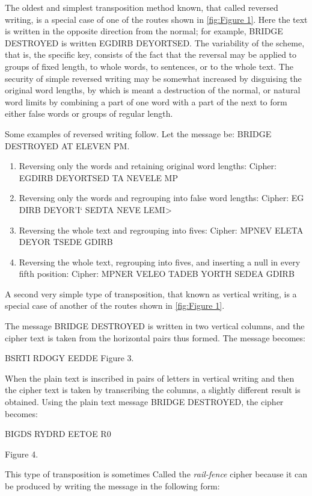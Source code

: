 \mypara The oldest and simplest transposition method known, that called reversed writing, is a special case of one of the routes shown in \ref{fig:Figure 1}.
Here the text is written in the opposite direction from the normal; for
example, BRIDGE DESTROYED is written EGDIRB DEYORTSED.
The variability of the scheme, that is, the specific key, consists of the fact
that the reversal may be applied to groups of fixed length, to whole
words, to sentences, or to the whole text. The security of simple reversed
writing may be somewhat increased by disguising the original word
lengths, by which is meant a destruction of the normal, or natural word
limits by combining a part of one word with a part of the next to form
either false words or groups of regular length.

\mypara Some examples of reversed writing follow. Let the message be:
BRIDGE DESTROYED AT ELEVEN PM.

\begin{enumerate}
\item Reversing only the words and retaining original word lengths:
Cipher: EGDIRB DEYORTSED TA NEVELE MP
\item Reversing only the words and regrouping into false word
lengths:
Cipher: EG DIRB DEYOR'I‘ SEDTA NEVE LEMI>
\item Reversing the whole text and regrouping into fives:
Cipher: MPNEV ELETA DEYOR TSEDE GDIRB
\item Reversing the whole text, regrouping into fives, and inserting
a null in every fifth position:
Cipher: MPNER VELEO TADEB YORTH SEDEA GDIRB
\end{enumerate}

\mypara A second very simple type of transposition, that known as vertical
writing, is a special case of another of the routes shown in \ref{fig:Figure 1}.

The message BRIDGE DESTROYED is written in two vertical
columns, and the cipher text is taken from the horizontal pairs
thus formed. The message becomes:

BSRTI RDOGY EEDDE
Figure 3.

When the plain text is inscribed in pairs of letters in vertical
writing and then the cipher text is taken by transcribing the
columns, a slightly different result is obtained. Using the plain
text message BRIDGE DESTROYED, the cipher becomes:

BIGDS RYDRD EETOE R0

Figure 4.

This type of transposition is sometimes Called the \textit{rail-fence} cipher
because it can be produced by writing the message in the following form:

